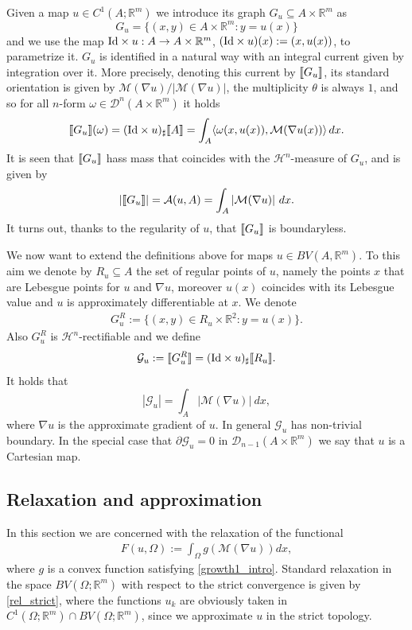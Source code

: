 \documentclass[a4paper,11pt]{article}
\numberwithin{equation}{section}
\newcommand{\jump}[1]{\text{{\rm \textlbrackdbl}}{#1}\text{{\rm \textrbrackdbl}}}
\newcommand{\Om}{\Omega}
\def\area{\mathcal A}
\newcommand{\R}{\mathbb{R}}
\begin{document}
Given a map  $u\in C^1(A;\R^m)$ we introduce its graph $G_u\subseteq A\times \R^m$ as
$$G_u=\{(x,y)\in A\times \R^m:y=u(x)\}$$ and we use the map $\text{{\rm Id}}\times u:A\rightarrow A\times \R^m$, $(\text{{\rm Id}}\times u)(x):=(x,u(x))$, to parametrize it.
$G_u$ is
 identified in a natural way with an integral current given by integration over it. More precisely, denoting this current by $\jump{G_u}$, its standard orientation  is given by $\mathcal M(\nabla u)/|\mathcal M(\nabla u)|$, the multiplicity $\theta$ is always $1$, and so for all $n$-form $\omega\in \mathcal D^n(A\times \R^m)$ it holds
$$\jump{G_u}(\omega)=(\text{{\rm Id}}\times u)_\sharp\jump{A}=\int_A\langle\omega(x,u(x)),\mathcal M(\nabla u(x))\rangle\, dx.$$
It is seen that  $\jump{G_u}$ hass mass that coincides with the  $\mathcal H^n$-measure of $G_u$, and is given by 
$$	|\jump{G_u}|=\area(u,A)=\int_A|\mathcal M(\nabla u)|~dx.$$
It turns out, thanks to the regularity of $u$, that $\jump{G_u}$ is boundaryless.

We now want to extend the definitions above for maps $u\in BV(A,\R^m)$. To this aim we denote by $R_u\subseteq A$ the set of regular points of $u$, namely the  points $x$ that are Lebesgue points for $u$ and $\nabla u$, moreover $u(x)$ 
coincides with its Lebesgue value and $u$ 
is approximately differentiable at $x$. We denote 
\begin{align*}
	G_u^R:=\{(x,y)\in R_u\times \R^2:y=u(x)\}.
\end{align*}
Also $G_u^R$ is $\mathcal H^n$-rectifiable
and we define $$\mathcal G_u:=\jump{G_u^R}=(\text{{\rm Id}}\times u)_\sharp\jump{R_u}.$$ It holds that  
$$	|\mathcal G_u|=\int_A|\mathcal M(\nabla u)|~dx,$$
where $\nabla u$ is the approximate gradient of $u$. In general $\mathcal G_u$ has non-trivial boundary. In the special case that $\partial\mathcal G_u=0$ in $\mathcal D_{n-1}(A\times \R^m)$ we say that $u$ is a Cartesian map. 

\subsection{Relaxation and approximation}
In this section we are concerned with the relaxation of the functional
\begin{align}\label{functional_F}
	F(u,\Om):=\int_\Om g(\mathcal M(\nabla u))dx,
\end{align}
where $g$ is a convex function satisfying \eqref{growth1_intro}.
Standard relaxation in the space $BV(\Om;\R^m)$ with respect to the strict convergence is given by \eqref{rel_strict}, where the functions $u_k$ are obviously taken in $C^1(\Om;\R^m)\cap BV(\Om;\R^m)$, since we approximate $u$ in the strict topology.
\end{document}

